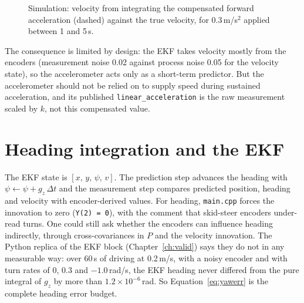 \documentclass[11pt,a4paper]{report}
\newcommand{\code}[1]{\texttt{#1}}
\begin{document}
\begin{figure}[H]\centering
{}
\caption{Simulation: velocity from integrating the compensated forward acceleration (dashed) against the true velocity, for 0.3\,m/s$^2$ applied between 1 and 5\,s.}\label{fig:leak}
\end{figure}

The consequence is limited by design: the EKF takes velocity mostly from the encoders (measurement noise 0.02 against process noise 0.05 for the velocity state), so the accelerometer acts only as a short-term predictor. But the accelerometer should not be relied on to supply speed during sustained acceleration, and its published \code{linear\_acceleration} is the raw measurement scaled by $k$, not this compensated value.

\section{Heading integration and the EKF}
The EKF state is $[x,\,y,\,\psi,\,v]$. The prediction step advances the heading with $\psi\leftarrow\psi+g_z\,\Delta t$ and the measurement step compares predicted position, heading and velocity with encoder-derived values. For heading, \code{main.cpp} forces the innovation to zero (\code{Y(2) = 0}), with the comment that skid-steer encoders under-read turns. One could still ask whether the encoders can influence heading indirectly, through cross-covariances in $P$ and the velocity innovation. The Python replica of the EKF block (Chapter~\ref{ch:valid}) says they do not in any measurable way: over 60\,s of driving at 0.2\,m/s, with a noisy encoder and with turn rates of 0, 0.3 and $-1.0$\,rad/s, the EKF heading never differed from the pure integral of $g_z$ by more than $1.2\times10^{-6}$\,rad. So Equation~\eqref{eq:yawerr} is the complete heading error budget.
\end{document}
